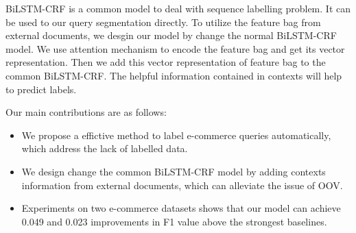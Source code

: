 BiLSTM-CRF \cite{Huang2015Bidirectional,Ma2016End} is a common model to deal with sequence labelling problem. It can be used to our query segmentation directly. To utilize the feature bag from external documents, we desgin our model by change the normal BiLSTM-CRF model. We use attention mechanism to encode the feature bag and get its vector representation. Then we add this vector representation of feature bag to the common BiLSTM-CRF. The helpful information contained in contexts will help to predict labels.



Our main contributions are as follows:
\begin{itemize}
	\item We propose a effictive method to label e-commerce queries automatically, which address the lack of labelled data.
	\item We design change the common BiLSTM-CRF model by adding contexts information from external documents, which can alleviate the issue of OOV.
	\item Experiments on two e-commerce datasets shows that our model can achieve 0.049 and 0.023 improvements in F1 value above the strongest baselines.
\end{itemize}


